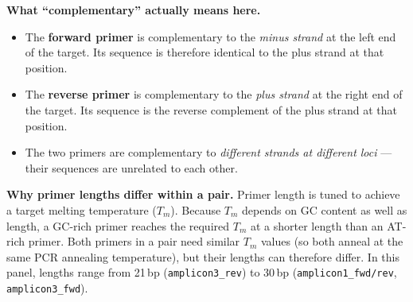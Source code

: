 \begin{tcolorbox}
\begin{center}
\end{center}

\medskip
\textbf{What ``complementary'' actually means here.}
\begin{itemize}
  \item The \textcolor{green!50!black}{\textbf{forward primer}} is complementary to the
        \emph{minus strand} at the left end of the target. Its sequence is therefore
        identical to the plus strand at that position.
  \item The \textcolor{orange!60!black}{\textbf{reverse primer}} is complementary to the
        \emph{plus strand} at the right end of the target. Its sequence is the reverse
        complement of the plus strand at that position.
  \item The two primers are complementary to \emph{different strands at different loci}
        --- their sequences are unrelated to each other.
\end{itemize}

\medskip
\textbf{Why primer lengths differ within a pair.}
Primer length is tuned to achieve a target melting temperature ($T_m$).
Because $T_m$ depends on GC content as well as length, a GC-rich primer reaches the
required $T_m$ at a shorter length than an AT-rich primer.
Both primers in a pair need similar $T_m$ values (so both anneal at the same PCR
annealing temperature), but their lengths can therefore differ.
In this panel, lengths range from 21\,bp (\texttt{amplicon3\_rev}) to 30\,bp
(\texttt{amplicon1\_fwd/rev}, \texttt{amplicon3\_fwd}).

\end{tcolorbox}
